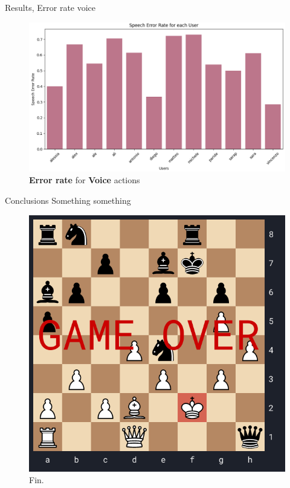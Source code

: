 \documentclass[english]{beamer}
\begin{document}
\begin{frame}{Results, Error rate voice}
    \begin{figure}
        \centering
        \includegraphics[width=.8\textwidth]{images/speech_error_rate.png}
        \caption{\textbf{Error rate} for \textbf{Voice} actions}
    \end{figure}
\end{frame}

\begin{frame}{Conclusions}
    Something something
    \begin{figure}
        \centering
        \includegraphics[width=.45\textwidth]{images/game_over_small.png}
        \caption{Fin.}
    \end{figure}
\end{frame}
\end{document}
